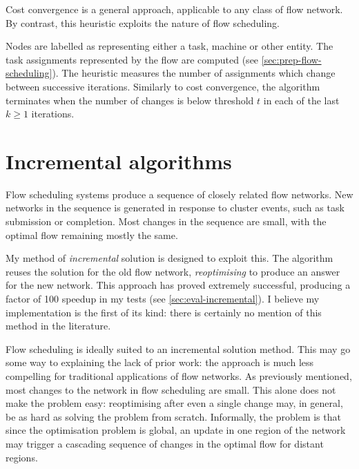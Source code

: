 Cost convergence is a general approach, applicable to any class of flow network. By contrast, this heuristic exploits the nature of flow scheduling.

Nodes are labelled as representing either a task, machine or other entity. The task assignments represented by the flow are computed (see \cref{sec:prep-flow-scheduling}). The heuristic measures the number of assignments which change between successive iterations. Similarly to cost convergence, the algorithm terminates when the number of changes is below threshold $t$ in each of the last $k \geq 1$ iterations.


\section{Incremental algorithms} \label{sec:impl-incremental}

Flow scheduling systems produce a sequence of closely related flow networks. New networks in the sequence is generated in response to cluster events, such as task submission or completion. Most changes in the sequence are small, with the optimal flow remaining mostly the same.

My method of \emph{incremental} solution is designed to exploit this. The algorithm reuses the solution for the old flow network, \emph{reoptimising} to produce an answer for the new network. This approach has proved extremely successful, producing a factor of 100 speedup in my tests (see \cref{sec:eval-incremental}). I believe my implementation is the first of its kind: there is certainly no mention of this method in the literature.

Flow scheduling is ideally suited to an incremental solution method. This may go some way to explaining the lack of prior work: the approach is much less compelling for traditional applications of flow networks. As previously mentioned, most changes to the network in flow scheduling are small. This alone does not make the problem easy: reoptimising after even a single change may, in general, be as hard as solving the problem from scratch\footnotemark. Informally, the problem is that since the optimisation problem is global, an update in one region of the network may trigger a cascading sequence of changes in the optimal flow for distant regions.

